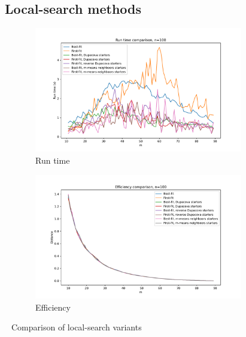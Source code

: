 \documentclass{amsart}
\begin{document}
\begin{appendices}
\section{$\quad$ Local-search methods}\label{all methods}

\begin{figure}[ht]
    \centering
    \begin{subfigure}[b]{0.495\textwidth}
        \centering
        \includegraphics[width=1.1\textwidth]{plots/run time methods.pdf}
        \caption{Run time}
    \end{subfigure}
    \hfill
    \begin{subfigure}[b]{0.495\textwidth}
        \centering
        \includegraphics[width=1.1\textwidth]{plots/value methods.pdf}
        \caption{Efficiency}
    \end{subfigure}
    \caption{Comparison of local-search variants}
    \label{methods}
\end{figure}

\end{appendices}
\end{document}
